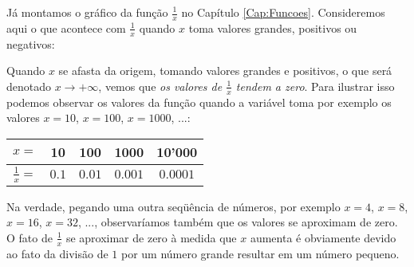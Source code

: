 \begin{ex}\label{expl_LIM_unsurx}
Já montamos o gráfico da função $\tfrac{1}{x}$ no Capítulo
\ref{Cap:Funcoes}. Consideremos aqui o que acontece com $\frac1x$ quando
$x$ toma valores grandes, positivos ou negativos:

\begin{center}
\begin{bmlimage}\end{bmlimage}
\end{center}

Quando $x$ se afasta da origem, tomando valores grandes e
positivos, o que será denotado $x\to+\infty$, 
vemos que \emph{os valores de $\tfrac{1}{x}$ tendem a
zero}. Para ilustrar isso podemos observar os valores da função quando a variável
toma por exemplo os valores $x=10$, $x=100$, $x=1000$, ...:
\begin{center}
\begin{tabular}{c|c|c|c|c}
$x=$&10&100&1000&10'000\\
\hline
$\frac{1}{x}=$&$0.1$&$0.01$&$0.001$&$0.0001$
\end{tabular}
\end{center}
Na verdade, pegando uma outra seqüência de números, por exemplo $x=4$,
$x=8$, $x=16$, $x=32$, ..., observaríamos também que os valores se
aproximam de zero.
O fato de $\frac{1}{x}$ se aproximar de zero à medida
que $x$ aumenta é obviamente devido
ao fato da divisão de $1$ por um número grande resultar em 
um número pequeno.


\end{ex}
